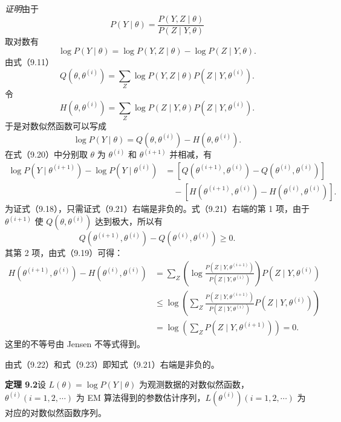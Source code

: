 \documentclass[UTF8, 12pt, fontset=fandol, oneside]{ctexart}
\begin{document}
\noindent\textit{证明}\quad 由于
\[
  P(Y\mid\theta)=\frac{P(Y,Z\mid\theta)}{P(Z\mid Y,\theta)}
\]
取对数有
\[
  \log P(Y\mid\theta)=\log P(Y,Z\mid\theta)-\log P(Z\mid Y,\theta).
\]
由式（9.11）
\[
  Q(\theta,\theta^{(i)})=\sum_Z \log P(Y,Z\mid\theta)P(Z\mid Y,\theta^{(i)}).
\]
令
\begin{equation}
  H(\theta,\theta^{(i)})=\sum_Z \log P(Z\mid Y,\theta)P(Z\mid Y,\theta^{(i)}).
  \tag{9.19}
\end{equation}
于是对数似然函数可以写成
\begin{equation}
  \log P(Y\mid\theta)=Q(\theta,\theta^{(i)})-H(\theta,\theta^{(i)}).
  \tag{9.20}
\end{equation}
在式（9.20）中分别取 $\theta$ 为 $\theta^{(i)}$ 和 $\theta^{(i+1)}$ 并相减，有
\begin{equation}
\begin{aligned}
  \log P(Y\mid\theta^{(i+1)})-\log P(Y\mid\theta^{(i)})
  &=[Q(\theta^{(i+1)},\theta^{(i)})-Q(\theta^{(i)},\theta^{(i)})]\\
  &\quad-[H(\theta^{(i+1)},\theta^{(i)})-H(\theta^{(i)},\theta^{(i)})].
\end{aligned}
  \tag{9.21}
\end{equation}
为证式（9.18），只需证式（9.21）右端是非负的。式（9.21）右端的第 1 项，由于 $\theta^{(i+1)}$ 使 $Q(\theta,\theta^{(i)})$ 达到极大，所以有
\begin{equation}
  Q(\theta^{(i+1)},\theta^{(i)})-Q(\theta^{(i)},\theta^{(i)})\geq0.
  \tag{9.22}
\end{equation}
其第 2 项，由式（9.19）可得：
\begin{equation}
\begin{aligned}
  H(\theta^{(i+1)},\theta^{(i)})-H(\theta^{(i)},\theta^{(i)})
  &=\sum_Z \left(\log\frac{P(Z\mid Y,\theta^{(i+1)})}
  {P(Z\mid Y,\theta^{(i)})}\right)P(Z\mid Y,\theta^{(i)})\\
  &\leq \log\left(\sum_Z
  \frac{P(Z\mid Y,\theta^{(i+1)})}{P(Z\mid Y,\theta^{(i)})}
  P(Z\mid Y,\theta^{(i)})\right)\\
  &=\log\left(\sum_Z P(Z\mid Y,\theta^{(i+1)})\right)=0.
\end{aligned}
  \tag{9.23}
\end{equation}
这里的不等号由 Jensen 不等式得到。

由式（9.22）和式（9.23）即知式（9.21）右端是非负的。

\noindent\textbf{定理 9.2}\quad 设 $L(\theta)=\log P(Y\mid\theta)$ 为观测数据的对数似然函数，$\theta^{(i)}(i=1,2,\cdots)$ 为 EM 算法得到的参数估计序列，$L(\theta^{(i)})(i=1,2,\cdots)$ 为对应的对数似然函数序列。
\end{document}
